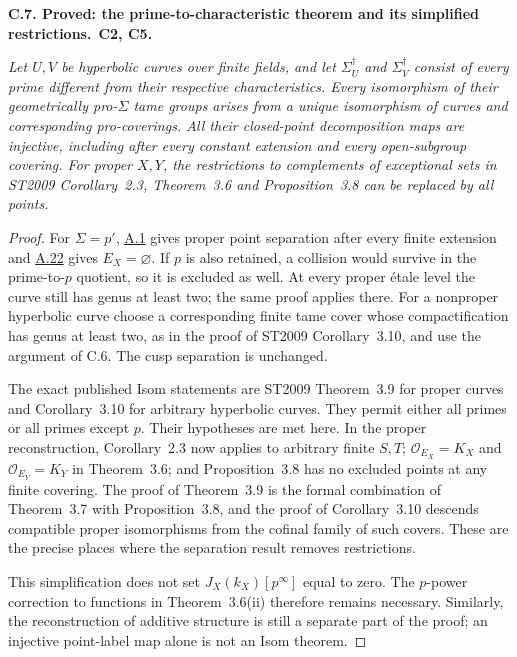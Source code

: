 \documentclass[11pt,a4paper]{article}
\newenvironment{claim}[3]{\par\medskip\noindent\hypertarget{#1}{\textbf{#1. #2.}}\ \textbf{#3.}\par\nopagebreak\smallskip\begingroup\itshape}{\endgroup\par\smallskip}
\newcommand{\statementref}[1]{\hyperlink{#1}{#1}}
\begin{document}
\begin{claim}{C.7}{Proved: the prime-to-characteristic theorem and its simplified restrictions}{C2, C5}
Let $U,V$ be hyperbolic curves over finite fields, and let
$\Sigma_U^\dagger$ and $\Sigma_V^\dagger$ consist of every prime
different from their respective characteristics. Every isomorphism
of their geometrically pro-$\Sigma$ tame groups arises from a unique
isomorphism of curves and corresponding pro-coverings. All their
closed-point decomposition maps are injective, including after
every constant extension and every open-subgroup covering. For
proper $X,Y$, the restrictions to complements of exceptional sets
in ST2009 Corollary~2.3, Theorem~3.6 and Proposition~3.8 can be
replaced by all points.
\end{claim}
\begin{proof}
For $\Sigma=p'$, \statementref{A.1} gives proper point
separation after every finite extension and
\statementref{A.22} gives $E_X=\varnothing$. If $p$ is also
retained, a collision would survive in the prime-to-$p$ quotient,
so it is excluded as well. At every proper \'etale level the
curve still has genus at least two; the same proof applies there.
For a nonproper hyperbolic curve choose a corresponding finite
tame cover whose compactification has genus at least two, as in
the proof of ST2009 Corollary~3.10, and use the argument of
C.6. The cusp separation is unchanged.

The exact published Isom statements are ST2009 Theorem~3.9
for proper curves and Corollary~3.10 for arbitrary hyperbolic
curves. They permit either all primes or all primes except $p$.
Their hypotheses are met here. In the proper reconstruction,
Corollary~2.3 now applies to arbitrary finite $S,T$;
$\mathcal O_{E_X}=K_X$ and $\mathcal O_{E_Y}=K_Y$ in
Theorem~3.6; and Proposition~3.8 has no excluded points at any
finite covering. The proof of Theorem~3.9 is the formal
combination of Theorem~3.7 with Proposition~3.8, and the proof
of Corollary~3.10 descends compatible proper isomorphisms from
the cofinal family of such covers. These are the precise places
where the separation result removes restrictions.
\citep[Corollary~2.3, Theorems~3.6--3.7, Proposition~3.8,
Theorem~3.9, Corollary~3.10]{LA_ST2009}

This simplification does not set $J_X(k_X)[p^\infty]$ equal
to zero. The $p$-power correction to functions in Theorem~3.6(ii)
therefore remains necessary. Similarly, the reconstruction of
additive structure is still a separate part of the proof; an
injective point-label map alone is not an Isom theorem.
\end{proof}
\end{document}
